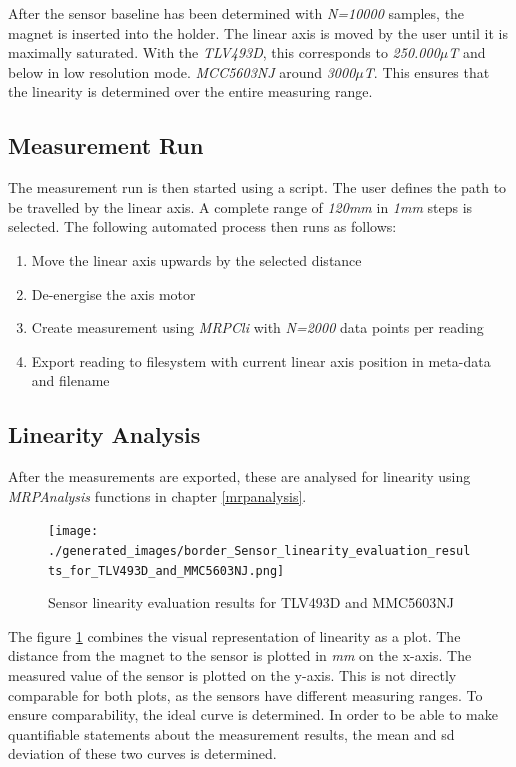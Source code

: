 After the sensor baseline has been determined with \emph{N=10000}
samples, the magnet is inserted into the holder. The linear axis is
moved by the user until it is maximally saturated. With the
\emph{TLV493D}, this corresponds to \emph{250.000\(\mu\)T} and below in
low resolution mode. \emph{MCC5603NJ} around \emph{3000\(\mu\)T}. This
ensures that the linearity is determined over the entire measuring
range.

\hypertarget{measurement-run}{%
\subsection{Measurement Run}\label{measurement-run}}

The measurement run is then started using a script. The user defines the
path to be travelled by the linear axis. A complete range of
\emph{120mm} in \emph{1mm} steps is selected. The following automated
process then runs as follows:

\begin{enumerate}
\def\labelenumi{\arabic{enumi}.}
\tightlist
\item
  Move the linear axis upwards by the selected distance
\item
  De-energise the axis motor
\item
  Create measurement using \emph{MRPCli} with \emph{N=2000} data points
  per reading
\item
  Export reading to filesystem with current linear axis position in
  meta-data and filename
\end{enumerate}

\hypertarget{linearity-analysis}{%
\subsection{Linearity Analysis}\label{linearity-analysis}}

After the measurements are exported, these are analysed for linearity
using \emph{MRPAnalysis} functions in chapter \ref{mrpanalysis}.

\begin{figure}
\centering
\texttt{[image: ./generated\_images/border\_Sensor\_linearity\_evaluation\_results\_for\_TLV493D\_and\_MMC5603NJ.png]}
\caption{Sensor linearity evaluation results for TLV493D and MMC5603NJ
\label{Sensor_linearity_evaluation_results_for_TLV493D_and_MMC5603NJ.png}}
\end{figure}

The figure
\ref{Sensor_linearity_evaluation_results_for_TLV493D_and_MMC5603NJ.png}
combines the visual representation of linearity as a plot. The distance
from the magnet to the sensor is plotted in \emph{mm} on the x-axis. The
measured value of the sensor is plotted on the y-axis. This is not
directly comparable for both plots, as the sensors have different
measuring ranges. To ensure comparability, the ideal curve is
determined. In order to be able to make quantifiable statements about
the measurement results, the mean and \gls{sd} deviation of these two
curves is determined.

